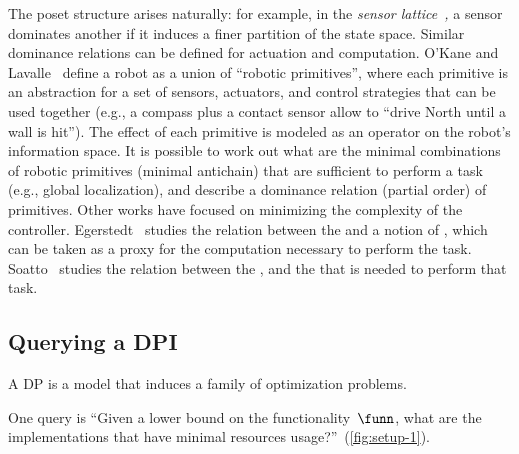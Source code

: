 The poset structure arises naturally: for example, in the \emph{sensor
lattice}~\cite{lavalle12sensing}\emph{,} a sensor dominates another
if it induces a finer partition of the state space. Similar dominance
relations can be defined for actuation and computation. O'Kane and
Lavalle~\cite{okane08comparing} define a robot as a union of ``robotic
primitives'', where each primitive is an abstraction for a set of
sensors, actuators, and control strategies that can be used together
(e.g., a compass plus a contact sensor allow to ``drive North until
a wall is hit''). The effect of each primitive is modeled as an operator
on the robot's information space. It is possible to work out what
are the minimal combinations of robotic primitives (minimal antichain)
that are sufficient to perform a task (e.g., global localization),
and describe a dominance relation (partial order) of primitives. Other
works have focused on minimizing the complexity of the controller.
Egerstedt~\cite{egerstedt03motion} studies the relation between
the  and a notion of , which can be taken as
a proxy for the computation necessary to perform the task. Soatto~\cite{soatto11steps}
studies the relation between the ,
and the  that is needed to perform that
task. 



\begin{example}
\end{example}



\subsection{Querying a DPI}

A DP is a model that induces a family of optimization problems.


One query is
``Given a lower bound on the functionality~$\funn$, what
are the implementations that have minimal resources usage?''~(\cref{fig:setup-1}).

